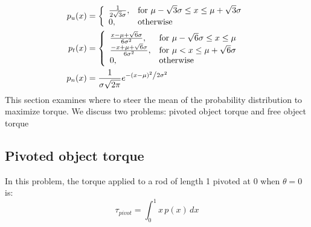 \begin{align}
p_u(x) &=  \left\{
\begin{array}{ll}
    \frac{1}{2\sqrt{3}\sigma}, &  \textrm{for   } \mu-\sqrt{3}\sigma \leq x \leq \mu+\sqrt{3}\sigma\\
     0, & \textrm{otherwise}\\
\end{array} 
\right.\\
p_t(x) &=  \left\{
\begin{array}{ll}
    \frac{x-\mu + \sqrt{6} \sigma}{6\sigma^2}, &  \textrm{for   } \mu-\sqrt{6}\sigma \leq x \leq \mu\\
     \frac{-x+\mu + \sqrt{6} \sigma}{6\sigma^2}, &  \textrm{for   } \mu < x \leq \mu+ \sqrt{6}\sigma\\
     0, & \textrm{otherwise}\\
\end{array} 
\right.\\
p_n(x) &= \frac{1}{{\sigma \sqrt {2\pi } }}e^{{{ - \left( {x - \mu } \right)^2 } \mathord{\left/ {\vphantom {{ - \left( {x - \mu } \right)^2 } {2\sigma ^2 }}} \right. \kern-\nulldelimiterspace} {2\sigma ^2 }}}
\end{align}
This section examines where to steer the mean of the probability distribution to maximize torque. We discuss two problems: pivoted object torque and free object torque
\subsection{Pivoted object torque}

In this problem, the torque applied to a rod of length 1 pivoted at 0 when $\theta = 0$ is:
\begin{equation}
\tau_{pivot} = \int_0^1 x\,p(x)\, dx
\end{equation}



